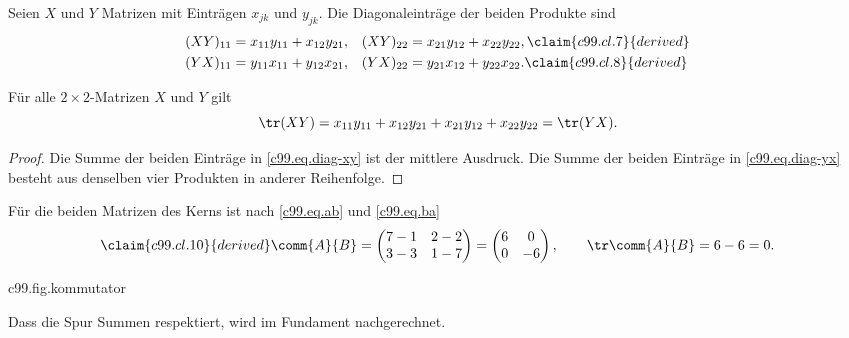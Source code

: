 \begin{vertiefung}[id=c99.v1,
    titel={Warum die Spuren übereinstimmen},
    wozu={Der Kern stellt Theorem~\ref{c99.thm.spur} ohne Beweis hin; hier wird es
      für beliebige Einträge ausgerechnet.},
    voraussetzung={Kern~\ref{c99.s1} bis Gleichung~\eqref{c99.eq.spuren}; nicht
      nötig für Abschnitt~\ref{c99.s2}.},
    zurueck={Die Spur eines Produkts hängt nicht von der Reihenfolge der Faktoren
      ab, das Produkt selbst schon.}]
  Seien $X$ und $Y$ Matrizen mit Einträgen $x_{jk}$ und $y_{jk}$. Die
  Diagonaleinträge der beiden Produkte sind
  \begin{align}
    (XY)_{11} &= x_{11}y_{11} + x_{12}y_{21}, &
    (XY)_{22} &= x_{21}y_{12} + x_{22}y_{22},
    \label{c99.eq.diag-xy}\claim{c99.cl.7}{derived} \\
    (YX)_{11} &= y_{11}x_{11} + y_{12}x_{21}, &
    (YX)_{22} &= y_{21}x_{12} + y_{22}x_{22}.
    \label{c99.eq.diag-yx}\claim{c99.cl.8}{derived}
  \end{align}

  \begin{lemma}\label{c99.lem.spur}
    Für alle $2\times 2$-Matrizen $X$ und $Y$ gilt
    \begin{equation}\label{c99.eq.spur-allgemein}
      \tr(XY) = x_{11}y_{11} + x_{12}y_{21} + x_{21}y_{12} + x_{22}y_{22} = \tr(YX).
    \end{equation}
  \end{lemma}
  \begin{proof}
    Die Summe der beiden Einträge in \eqref{c99.eq.diag-xy} ist der mittlere
    Ausdruck. Die Summe der beiden Einträge in \eqref{c99.eq.diag-yx} besteht aus
    denselben vier Produkten in anderer Reihenfolge.
  \end{proof}


  Für die beiden Matrizen des Kerns ist nach \eqref{c99.eq.ab} und \eqref{c99.eq.ba}
  \begin{equation}\label{c99.eq.kommutator}\claim{c99.cl.10}{derived}
    \comm{A}{B} = \begin{pmatrix} 7-1 & 2-2 \\ 3-3 & 1-7 \end{pmatrix}
                = \begin{pmatrix} 6 & 0 \\ 0 & -6 \end{pmatrix},
    \qquad
    \tr\comm{A}{B} = 6 - 6 = 0.
  \end{equation}

  \begin{tpcfigure}{c99.fig.kommutator}
    \caption{Der Kommutator aus \eqref{c99.eq.kommutator} als Abbildung: Er streckt
      um den Faktor $6$ und spiegelt an der waagerechten Achse.}
  \end{tpcfigure}

  Dass die Spur Summen respektiert, wird im Fundament nachgerechnet.
\end{vertiefung}

